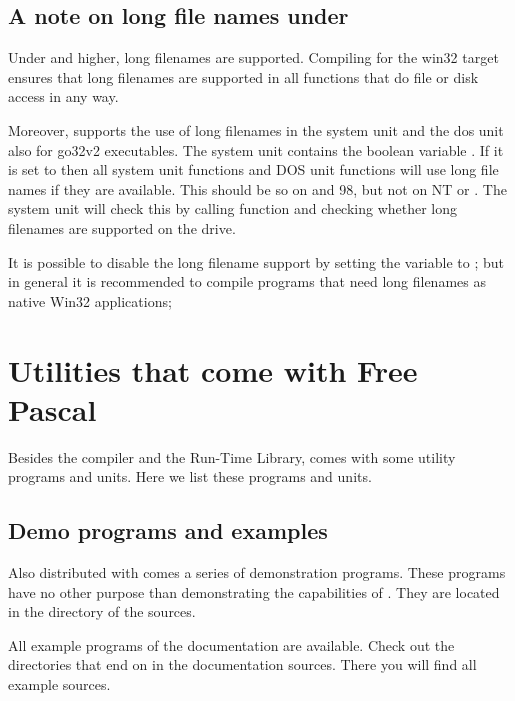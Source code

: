 \section{A note on long file names under \dos}
Under  and higher, long filenames are supported. Compiling
for the win32 target ensures that long filenames are supported in all
functions that do file or disk access in any way.

Moreover, \fpc supports the use of long filenames in the system unit and
the dos unit also for go32v2 executables. The system unit contains the
boolean variable . If it is set to  then all
system unit functions and DOS unit functions will use long file names
if they are available. This should be so on  and 98, but
not on \windows NT or . The system unit will check this 
by calling \dos function  and checking whether long filenames 
are supported on the  drive.

It is possible to disable the long filename support by setting the
 variable to ; but in general it is recommended
to compile programs that need long filenames as native Win32 applications;



\chapter{Utilities that come with Free Pascal}
\label{ch:Utilities}
Besides the compiler and the Run-Time Library, \fpc comes with some utility
programs and units. Here we list these programs and units.

\section{Demo programs and examples}
Also distributed with \fpc comes a series of demonstration programs.
These programs have no other purpose than demonstrating the capabilities of
\fpc. They are located in the  directory of the sources.

All example programs of the documentation are available. Check out the
directories that end on  in the documentation sources. There you
will find all example sources.

